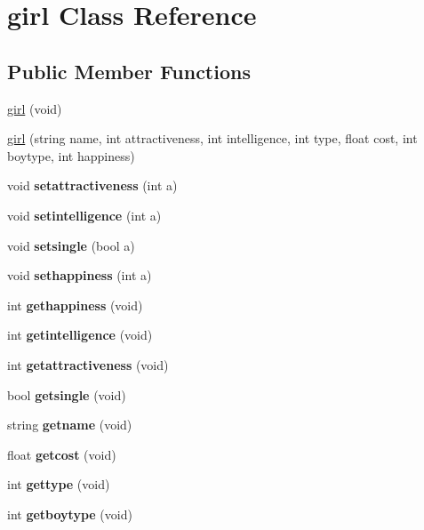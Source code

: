 \hypertarget{classgirl}{}\section{girl Class Reference}
\label{classgirl}
\subsection*{Public Member Functions}
\begin{DoxyCompactItemize}
\item 
\hyperlink{classgirl_a4289c0c8d342d5aaea2f3cf52f75f2c3}{girl} (void)
\item 
\hyperlink{classgirl_a17da7a25b35ebb492f61c8dae4b241d6}{girl} (string name, int attractiveness, int intelligence, int type, float cost, int boytype, int happiness)
\item 
\mbox{\label{classgirl_a489d108c6b9d7081c7b80e202e7dc300}} 
void {\bfseries setattractiveness} (int a)
\item 
\mbox{\label{classgirl_a53a75614886ada5d0a62c94d332df6f6}} 
void {\bfseries setintelligence} (int a)
\item 
\mbox{\label{classgirl_a4cd4add9dc6f213af4b7cfe62e4c1bc9}} 
void {\bfseries setsingle} (bool a)
\item 
\mbox{\label{classgirl_a2eb6dcc56541effce506f1a461543320}} 
void {\bfseries sethappiness} (int a)
\item 
\mbox{\label{classgirl_a65530b773a223b89e47af0342423cf00}} 
int {\bfseries gethappiness} (void)
\item 
\mbox{\label{classgirl_ae1dfb1f4b22f4f0183fd1eb57e1e9bc7}} 
int {\bfseries getintelligence} (void)
\item 
\mbox{\label{classgirl_a8d5da51969c156bf9a6d6839d4d3ec94}} 
int {\bfseries getattractiveness} (void)
\item 
\mbox{\label{classgirl_af5b4802ecc6463571bb7a0e659911a39}} 
bool {\bfseries getsingle} (void)
\item 
\mbox{\label{classgirl_a991acaea9a8f567b34d8368a0a1347dd}} 
string {\bfseries getname} (void)
\item 
\mbox{\label{classgirl_a39aa5aa213c1b46fab54645c9397ebd0}} 
float {\bfseries getcost} (void)
\item 
\mbox{\label{classgirl_a2f00681e7416e64149251d2e1ef61c5b}} 
int {\bfseries gettype} (void)
\item 
\mbox{\label{classgirl_a476dee8f2d760fcd2d45c90865e5469a}} 
int {\bfseries getboytype} (void)
\end{DoxyCompactItemize}


